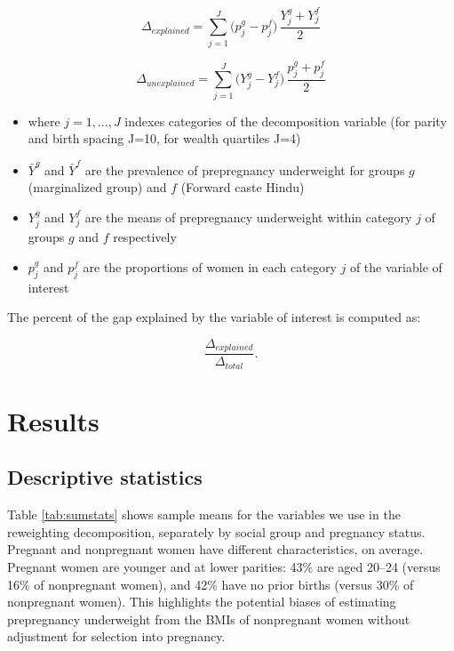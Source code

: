 \documentclass[12pt]{article}
\begin{document}
\begin{equation} \label{eq_explained}
    \Delta_{explained} = \sum_{j=1}^{J} \big(p_j^{g} - p_j^{f}\big)\,\frac{Y_j^{g} + Y_j^{f}}{2}
\end{equation}

\begin{equation} \label{eq_unexplained}
    \Delta_{unexplained} = \sum_{j=1}^{J} \big(Y_j^{g} - Y_j^{f}\big)\,\frac{p_j^{g} + p_j^{f}}{2}
\end{equation}

\begin{itemize}
    \item where \(j=1,...,J\) indexes categories of the decomposition variable (for parity and birth spacing J=10, for wealth quartiles J=4)
    \item \( \bar Y^g\) and \(\bar Y^f\) are the prevalence of prepregnancy underweight for groups \(g\) (marginalized group) and \(f\) (Forward caste Hindu)
    \item \(Y_j^g\) and \(Y_j^f\) are the means of prepregnancy underweight within category \(j\) of groups \(g\) and \(f\) respectively
    \item \(p_j^g\) and \(p_j^f\) are the proportions of women in each category \(j\) of the variable of interest
    
\end{itemize}

The percent of the gap explained by the variable of interest is computed as:

\begin{equation} \label{eq_pct}
    \frac{\Delta_{explained}}{\Delta_{total}}.
\end{equation}

\section{Results}

\subsection*{Descriptive statistics}

Table \ref{tab:sumstats} shows sample means for the variables we use in the reweighting decomposition, separately by social group and pregnancy status. Pregnant and nonpregnant women have different characteristics, on average. Pregnant women are younger and at lower parities: 43\% are aged 20–24 (versus 16\% of nonpregnant women), and 42\% have no prior births (versus 30\% of nonpregnant women). This highlights the potential biases of estimating prepregnancy underweight from the BMIs of nonpregnant women without adjustment for selection into pregnancy.
\end{document}
